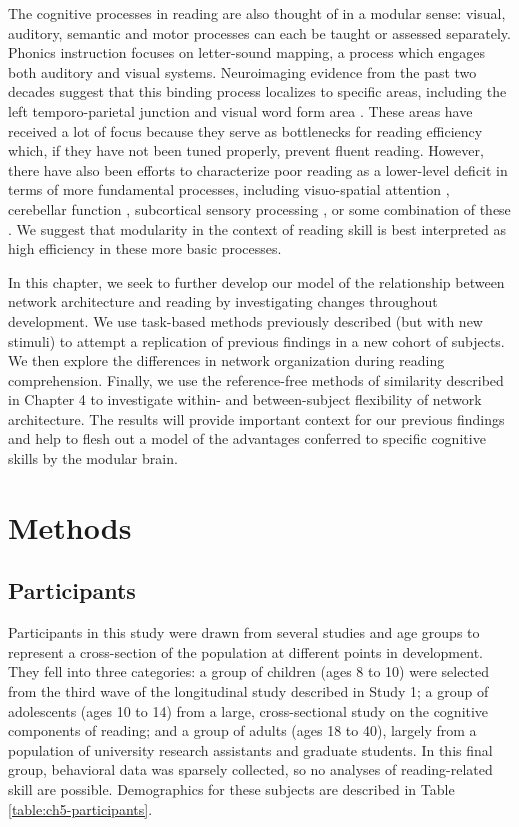 The cognitive processes in reading are also thought of in a modular sense: visual, auditory, semantic and motor processes can each be taught or assessed separately. Phonics instruction focuses on letter-sound mapping, a process which engages both auditory and visual systems. Neuroimaging evidence from the past two decades suggest that this binding process localizes to specific areas, including the left temporo-parietal junction and visual word form area \citep{Price2012}. These areas have received a lot of focus because they serve as bottlenecks for reading efficiency which, if they have not been tuned properly, prevent fluent reading. However, there have also been efforts to characterize poor reading as a lower-level deficit in terms of more fundamental processes, including visuo-spatial attention \citep{Vidyasagar2010}, cerebellar function \citep{Pernet2009, Eckert2003},  subcortical sensory processing \citep{Stein1997, Fan2014}, or some combination of these \citep{Pernet2009}. We suggest that modularity in the context of reading skill is best interpreted as high efficiency in these more basic processes. 

In this chapter, we seek to further develop our model of the relationship between network architecture and reading by investigating changes throughout development. We use task-based methods previously described (but with new stimuli) to attempt a replication of previous findings in a new cohort of subjects.  We then explore the differences in network organization during reading comprehension. Finally, we use the reference-free methods of similarity described in Chapter 4 to investigate within- and between-subject flexibility of network architecture. The results will provide important context for our previous findings and help to flesh out a model of the advantages conferred to specific cognitive skills by the modular brain.


\section{Methods}

\subsection{Participants}

Participants in this study were drawn from several studies and age groups to represent a cross-section of the population at different points in development. They fell into three categories: a group of children (ages 8 to 10) were selected from the third wave of the longitudinal study described in Study 1;  a group of adolescents (ages 10 to 14) from a large, cross-sectional study on the cognitive components of reading; and a group of adults (ages 18 to 40), largely from a population of university research assistants and graduate students. In this final group, behavioral data was sparsely collected, so no analyses of reading-related skill are possible. Demographics for these subjects are described in Table \ref{table:ch5-participants}.

